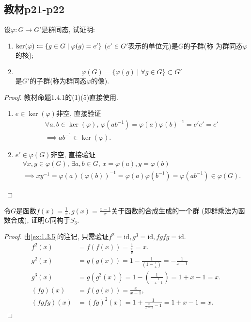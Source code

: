 \subsection{教材p21-p22}

\begin{problem}\label{ex:1.4.1}
    设$\varphi:G \to G'$是群同态, 试证明: 
\begin{enumerate}[(1)]
    \item $\ker(\varphi) \mathrel{\coloneqq} \{g \in G \mid \varphi(g) = e'\}$ $(e' \in G'$表示的单位元)是$G$的子群(称
为群同态$\varphi$的核);
    \item \[\varphi(G) = \{\varphi(g) \mid \forall g \in G\} \subset G'\]
是$G'$的子群(称为群同态$\varphi$的像).
\end{enumerate}
\end{problem}

\begin{proof}
    教材命题1.4.1的(1)(5)直接使用.
\begin{enumerate}[(1)]
    \item $e \in \ker(\varphi)$非空, 直接验证\[
    \begin{gathered}
        \forall a, b \in \ker(\varphi),\, \varphi(ab^{-1}) = \varphi(a)\varphi(b)^{-1} = e'e' = e'\\
        \implies ab^{-1} \in \ker(\varphi).
    \end{gathered}
    \]
    \item $e' \in \varphi(G)$非空, 直接验证\[
    \begin{gathered}
        \forall x, y \in \varphi(G),\, \exists a, b \in G,\, x = \varphi(a), y = \varphi(b)\\
        \implies xy^{-1} = \varphi(a)(\varphi(b))^{-1} = \varphi(a)\varphi(b^{-1}) = \varphi(ab^{-1}) \in \varphi(G).
    \end{gathered}
    \]
\end{enumerate}
\end{proof}

\begin{problem}
    令$G$是函数$f(x) = \frac1x, g(x) = \frac{x-1}x$关于函数的合成生成的一个群
(即群乘法为函数合成), 证明$G$同构于$S_3$.
\end{problem}

\begin{proof}
    由\ref{ex:1.3.5}的注记, 只需验证$f^2 = \mathrm{id}, g^3 = \mathrm{id}, fgfg = \mathrm{id}$.
\[
\begin{aligned}
    f^2(x) &= f(f(x)) = \frac{1}{\frac{1}{x}} = x.\\
    g^2(x) &= g(g(x)) = 1 - \frac{1}{(1 - \frac{1}{x})} = -\frac{1}{x - 1}\\
    g^3(x) &= g(g^2(x)) = 1 - (\frac{1}{-\frac{1}{x - 1}}) = 1 + x - 1 = x.\\
    (fg)(x) &= f(g(x)) = \frac{x}{x - 1},\\
    (fgfg)(x) &= (fg)^2(x) = 1 + \frac{1}{\frac{x}{x - 1} - 1} = 1 + x - 1 = x.
\end{aligned}
\]

\end{proof}

